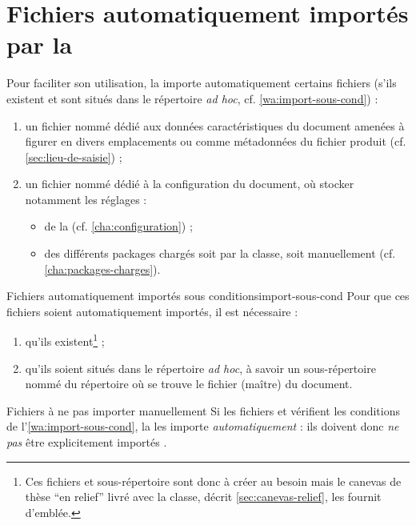 \chapter{Fichiers automatiquement importés par la \yatcl{}}
\label{cha:fichiers-importes-par}

Pour faciliter son utilisation, la \yatcl{} importe automatiquement certains
fichiers (s'ils existent et sont situés dans le répertoire \emph{ad hoc},
cf. \vref{wa:import-sous-cond}) :
\begin{enumerate}
\item un fichier nommé \file{\characteristicsfile} dédié aux données
  caractéristiques du document amenées à figurer en divers emplacements ou
  comme métadonnées du fichier \pdf produit (cf. \vref{sec:lieu-de-saisie}) ;
\item un fichier nommé \file{\configurationfile} dédié à la configuration du
  document, où stocker notamment les réglages :
  \begin{itemize}
  \item de la \yatcl (cf. \vref{cha:configuration}) ;
  \item des différents packages chargés soit par la classe, soit manuellement
    (cf. \vref{cha:packages-charges}).
  \end{itemize}
\end{enumerate}
\begin{dbwarning}{Fichiers automatiquement importés sous conditions}{import-sous-cond}
  Pour que ces fichiers soient automatiquement importés, il est
  nécessaire :
  \begin{enumerate}
  \item qu'ils existent\footnote{Ces fichiers et sous-répertoire sont donc
      à créer au besoin mais le canevas de thèse \enquote{en relief} livré avec
      la classe, décrit \vref{sec:canevas-relief}, les fournit d'emblée.} ;
  \item qu'ils soient situés dans le répertoire \emph{ad hoc}, à savoir un
    sous-répertoire nommé \directory{\configurationdirectory} du répertoire où
    se trouve le fichier (maître) du document.
  \end{enumerate}
\end{dbwarning}
\begin{dbwarning}{Fichiers à ne pas importer manuellement}{}
  Si les fichiers \file{\characteristicsfile} et \file{\configurationfile}
  vérifient les conditions de l'\vref{wa:import-sous-cond}, la \yatcl{} les
  importe \emph{automatiquement} : ils doivent donc \emph{ne pas} être
  explicitement importés .
\end{dbwarning}
